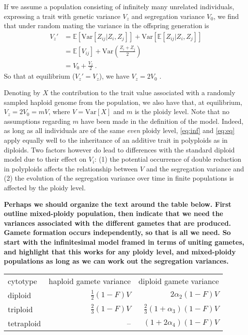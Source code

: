 \documentclass[unnumsec,webpdf,modern,large]{_oup-authoring-template}
\theoremstyle{thmstyleone}%
\theoremstyle{thmstyletwo}%
\theoremstyle{thmstylethree}%
\newcommand{\Ex}{\mathbb{E}}
\newcommand{\Var}{\mathrm{Var}}
\begin{document}
If we assume a population consisting of infinitely many unrelated
individuals, expressing a trait with genetic variance \(V_z\) and
segregation variance \(V_0\), we find that under random mating the
variance in the offspring generation is
\begin{align}
V_z' &= \Ex[\Var[Z_{ij}|Z_i, Z_j]] + \Var[\Ex[Z_{ij}|Z_i,Z_j]] \nonumber \\
   &= \Ex[V_{ij}] + \Var\left(\frac{Z_i + Z_j}{2}\right) \nonumber \\
   &= V_0 + \frac{V_z}{2}\ .
   \label{eq:eq}
\end{align}
So that at equilibrium (\(V_z'=V_z\)), we have \(V_z = 2V_0\) \citep{barton2017}.

Denoting by \(X\) the contribution to the trait value associated with a
randomly sampled haploid genome from the population, we also have that, at
equilibrium, \(V_z=2V_0=mV\), where \(V = \Var[X]\) and $m$ is the ploidy
level.
Note that no assumptions regarding $m$ have been made in the definition of the
model.
Indeed, as long as all individuals are of the same \emph{even} ploidy level,
\cref{eq:inf} and \cref{eq:eq} apply equally well to the inheritance of an
additive trait in polyploids as in diploids.
Two factors however do lead to differences with the standard diploid model due
to their effect on \(V_i\):
(1) the potential occurrence of double reduction in polyploids affects the
relationship between \(V\) and the segregation variance and 
(2) the evolution of the segregation variance over time in finite populations
is affected by the ploidy level.


\textbf{Perhaps we should organize the text around the table below. First
outline mixed-ploidy population, then indicate that we need the variances
associated with the different gametes that are produced. Gamete formation
occurs independently, so that is all we need. So start with the infinitesimal
model framed in terms of uniting gametes, and highlight that this works for any
ploidy level, and mixed-ploidy populations as long as we can work out the
segregation variances.}

\begin{table}[]
\begin{tabular}{l|rr}
cytotype   & haploid gamete variance & diploid gamete variance             \\ \cline{1-3}
diploid    & $\frac{1}{2}(1- F)V$    & $2\alpha_2(1-F)V$  \\
triploid   & $\frac{2}{3}(1-F)V$     & $\frac{2}{3}(1 + \alpha_3)(1-F)V$   \\
tetraploid & --                      & $(1+2\alpha_4)(1-F)V$             
\end{tabular}%
\end{table}
\end{document}
